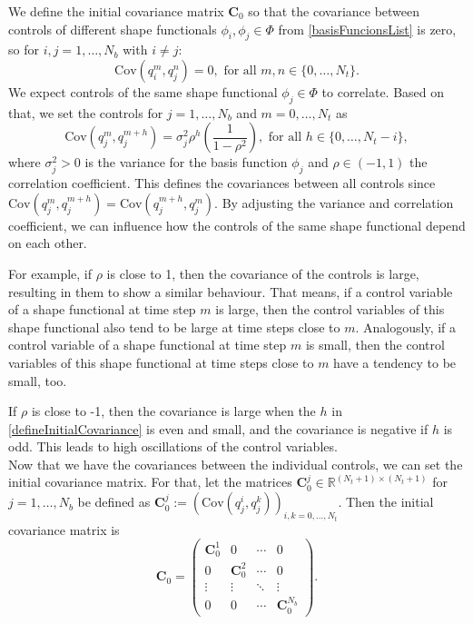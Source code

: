 We define the initial covariance matrix $\mathbf{C}_0$ so that the covariance between controls of different shape functionals $\phi_i,\phi_j\in\Phi$ from \eqref{basisFuncionsList} is zero, so for $i,j=1,\dotsc,N_b$ with $i\neq j$:
\begin{equation*}
\mathrm{Cov}(q_i^m,q_j^n)=0,\text{ for all }m,n\in\{0,\dotsc,N_t\}.
\end{equation*}
We expect controls of the same shape functional $\phi_j\in\Phi$ to correlate. Based on that, we set the controls for $j=1,\dotsc,N_b$ and $m=0,\dotsc,N_t$ as
\begin{equation}
\label{defineInitialCovariance}
\mathrm{Cov}(q_j^m,q_j^{m+h})=\sigma_j^2\rho^h\left(\frac{1}{1-\rho^2}\right),\text{ for all }h\in\{0,\dotsc,N_t-i\},
\end{equation}
where $\sigma_j^2>0$ is the variance for the basis function $\phi_j$ and $\rho\in(-1,1)$ the correlation coefficient. This defines the covariances between all controls since $\mathrm{Cov}(q_j^m,q_j^{m+h})=\mathrm{Cov}(q_j^{m+h},q_j^m)$. By adjusting the variance and correlation coefficient, we can influence how the controls of the same shape functional depend on each other.

For example, if $\rho$ is close to 1, then the covariance of the controls is large, resulting in them to show a similar behaviour. That means, if a control variable of a shape functional at time step $m$ is large, then the control variables of this shape functional also tend to be large at time steps close to $m$. Analogously, if a control variable of a shape functional at time step $m$ is small, then the control variables of this shape functional at time steps close to $m$ have a tendency to be small, too.

If $\rho$ is close to -1, then the covariance is large when the $h$ in \eqref{defineInitialCovariance} is even and small, and the covariance is negative if $h$ is odd. This leads to high oscillations of the control variables.\\

Now that we have the covariances between the individual controls, we can set the initial covariance matrix. For that, let the matrices $\mathbf{C}^j_0\in\mathbb{R}^{(N_t+1)\times(N_t+1)}$ for $j=1,\dotsc,N_b$ be defined as $\mathbf{C}^j_0:=\left(\mathrm{Cov}(q_j^i,q_j^{k})\right)_{i,k=0,\dotsc,N_t}$. Then the initial covariance matrix is
\begin{equation}
\label{initCov}
\mathbf{C}_0 =
\begin{pmatrix}
  \mathbf{C}^1_0 & 0 & \cdots & 0 \\
  0 & \mathbf{C}^2_0 & \cdots & 0 \\
  \vdots  & \vdots  & \ddots & \vdots  \\
  0 & 0 & \cdots & \mathbf{C}^{N_b}_0 
 \end{pmatrix}.
\end{equation}
\\

